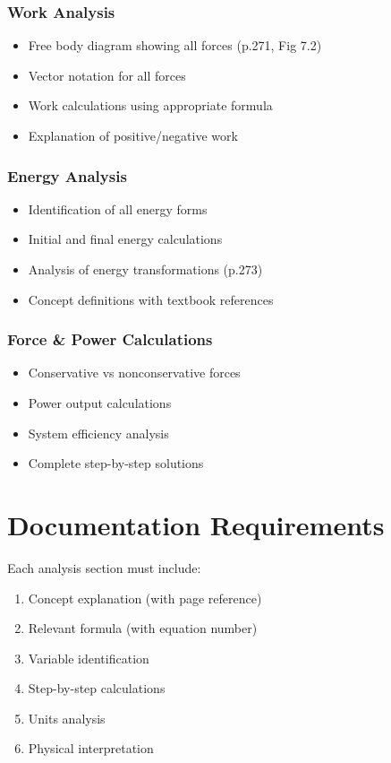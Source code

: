 \documentclass[12pt]{article}
\begin{document}
\subsubsection{Work Analysis}
\begin{itemize}
\item Free body diagram showing all forces (p.271, Fig 7.2)
\item Vector notation for all forces
\item Work calculations using appropriate formula
\item Explanation of positive/negative work
\end{itemize}

\subsubsection{Energy Analysis}
\begin{itemize}
\item Identification of all energy forms
\item Initial and final energy calculations
\item Analysis of energy transformations (p.273)
\item Concept definitions with textbook references
\end{itemize}

\subsubsection{Force \& Power Calculations}
\begin{itemize}
\item Conservative vs nonconservative forces
\item Power output calculations
\item System efficiency analysis
\item Complete step-by-step solutions
\end{itemize}



\section{Documentation Requirements}
Each analysis section must include:
\begin{enumerate}
\item Concept explanation (with page reference)
\item Relevant formula (with equation number)
\item Variable identification
\item Step-by-step calculations
\item Units analysis
\item Physical interpretation
\end{enumerate}
\end{document}
